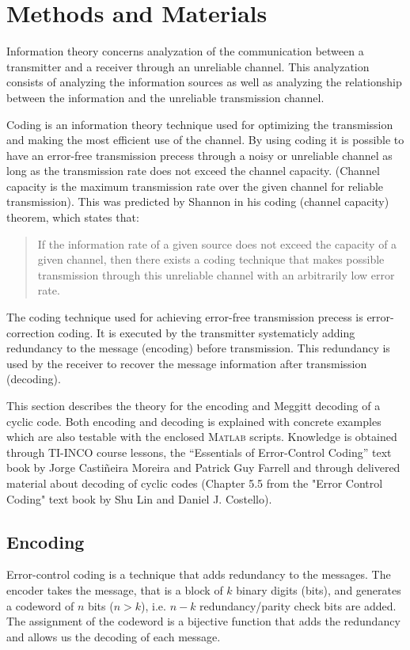 \documentclass[Main]{subfiles}
\begin{document}
\section{Methods and Materials}
Information theory concerns analyzation of the communication between a transmitter and a receiver through an unreliable channel. This analyzation consists of analyzing the information sources as well as analyzing the relationship between the information and the unreliable transmission channel. 

Coding is an information theory technique used for optimizing the transmission and making the most efficient use of the channel.
By using coding it is possible to have an error-free transmission precess through a noisy or unreliable channel as long as the transmission rate does not exceed the channel capacity.
(Channel capacity is the maximum transmission rate over the given channel for reliable transmission).
This was predicted by Shannon in his coding (channel capacity) theorem, which states that: 

 \begin{quotation} \noindent If the information rate of a given source does not exceed the capacity of a given channel, then there exists a coding technique that makes possible transmission through this unreliable channel with an arbitrarily low error rate. \end{quotation}
 
The coding technique used for achieving error-free transmission precess is error-correction coding. It is executed by the transmitter systematicly adding redundancy to the message (encoding) before transmission. This redundancy is used by the receiver to recover the message information after transmission (decoding). 

This section describes the theory for the encoding and Meggitt decoding of a cyclic code. 
Both encoding and decoding is explained with concrete examples which are also testable with the enclosed \textsc{Matlab} scripts. 
Knowledge is obtained through TI-INCO course lessons, the ``Essentials of Error-Control Coding'' text book by Jorge Casti\~{n}eira Moreira and Patrick Guy Farrell and through delivered material about decoding of cyclic codes (Chapter 5.5 from the "Error Control Coding" text book by Shu Lin and Daniel J. Costello). 

\subsection{Encoding}
Error-control coding is a technique that adds redundancy to the messages. The encoder takes the message, that is a block of $k$ binary digits (bits), and generates a codeword of $n$ bits ($n > k$), i.e. $n - k$ redundancy/parity check bits are added. The assignment of the codeword is a bijective function that adds the redundancy and allows us the decoding of each message. 
\end{document}
